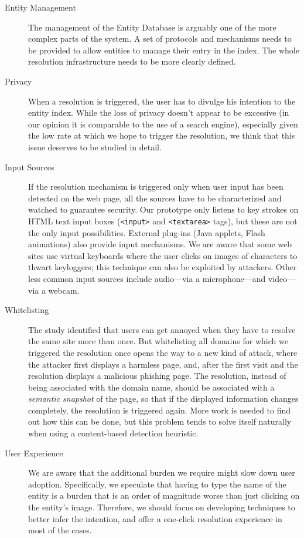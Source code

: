 \documentclass[11pt,styles/chicago,a4paper]{article}
\begin{document}
\begin{description}
\item[Entity Management] The management of the Entity Database is arguably one of the more complex parts of the system. A set of protocols and mechanisms needs to be provided to allow entities to manage their entry in the index. The whole resolution infrastructure needs to be more clearly defined.

\item[Privacy] When a resolution is triggered, the user has to divulge his intention to the entity index. While the loss of privacy doesn't appear to be excessive (in our opinion it is comparable to the use of a search engine), especially given the low rate at which we hope to trigger the resolution, we think that this issue deserves to be studied in detail.

\item[Input Sources] If the resolution mechanism is triggered only when user input has been detected on the web page, all the sources have to be characterized and watched to guarantee security. Our prototype only listens to key strokes on HTML text input boxes (\texttt{<input>} and \texttt{<textarea>} tags), but these are not the only input possibilities. External plug-ins (Java applets, Flash animations) also provide input mechanisms. We are aware that some web sites use virtual keyboards where the user clicks on images of characters to thwart keyloggers; this technique can also be exploited by attackers. Other less common input sources include audio---via a microphone---and video---via a webcam.

\item[Whitelisting] The study identified that users can get annoyed when they have to resolve the same site more than once. But whitelisting all domains for which we triggered the resolution once opens the way to a new kind of attack, where the attacker first displays a harmless page, and, after the first visit and the resolution displays a malicious phishing page. The resolution, instead of being associated with the domain name, should be associated with a \emph{semantic snapshot} of the page, so that if the displayed information changes completely, the resolution is triggered again. More work is needed to find out how this can be done, but this problem tends to solve itself naturally when using a content-based detection heuristic.

\item[User Experience] We are aware that the additional burden we require might slow down user adoption. Specifically, we speculate that having to type the name of the entity is a burden that is an order of magnitude worse than just clicking on the entity's image. Therefore, we should focus on developing techniques to better infer the intention, and offer a one-click resolution experience in most of the cases.


\end{description}
\end{document}
